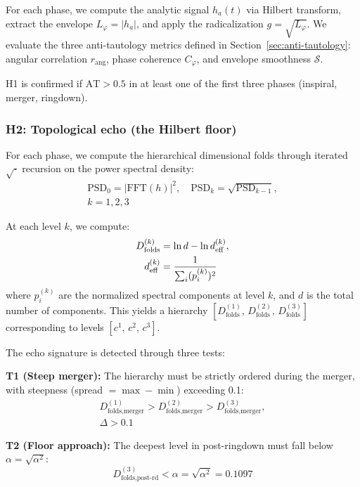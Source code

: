 \documentclass[12pt,a4paper,twocolumn]{article}
\newcommand{\alphaii}{\alpha^{2}}
\newcommand{\Dfolds}{D_{\text{folds}}}
\begin{document}
For each phase, we compute the analytic signal $h_a(t)$ via Hilbert transform, extract the envelope $L_\varphi = |h_a|$, and apply the radicalization $g = \sqrt{L_\varphi}$. We evaluate the three anti-tautology metrics defined in Section~\ref{sec:anti-tautology}: angular correlation $r_{\text{ang}}$, phase coherence $C_\varphi$, and envelope smoothness $\mathcal{S}$.

H1 is confirmed if $\text{AT} > 0.5$ in at least one of the first three phases (inspiral, merger, ringdown).

\subsubsection{H2: Topological echo (the Hilbert floor)}
\label{sec:alpha-threshold}

For each phase, we compute the hierarchical dimensional folds through iterated $\sqrt{\cdot}$ recursion on the power spectral density:
\begin{multline}
\label{eq:hierarchical}
\text{PSD}_0 = |\text{FFT}(h)|^2, \quad \text{PSD}_k = \sqrt{\text{PSD}_{k-1}}, \\
k = 1,2,3
\end{multline}

At each level $k$, we compute:
\begin{align}
\Dfolds^{(k)} &= \ln d - \ln d_{\text{eff}}^{(k)}, \notag\\
d_{\text{eff}}^{(k)} &= \frac{1}{\sum_i (p_i^{(k)})^2}
\end{align}
where $p_i^{(k)}$ are the normalized spectral components at level $k$, and $d$ is the total number of components. This yields a hierarchy $[\Dfolds^{(1)},\, \Dfolds^{(2)},\, \Dfolds^{(3)}]$ corresponding to levels $[c^1,\, c^2,\, c^3]$.

The echo signature is detected through three tests:

\textbf{T1 (Steep merger):} The hierarchy must be strictly ordered during the merger, with steepness (spread $= \max - \min$) exceeding 0.1:
\begin{multline}
D_{\text{folds,merger}}^{(1)} > D_{\text{folds,merger}}^{(2)} > D_{\text{folds,merger}}^{(3)}, \\
\Delta > 0.1
\end{multline}

\textbf{T2 (Floor approach):} The deepest level in post-ringdown must fall below $\alpha = \sqrt{\alphaii}$:
\begin{equation}
\label{eq:T2}
D_{\text{folds},\text{post-rd}}^{(3)} < \alpha = \sqrt{\alphaii} = 0.1097
\end{equation}
\end{document}
